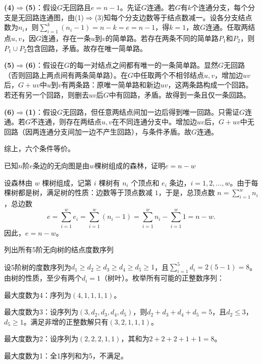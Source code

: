\textbf{(4)$\Rightarrow$(5)}：假设$G$无回路且$e=n-1$。先证$G$连通。若$G$有$k$个连通分支，每个分支是无回路连通图，由(1)$\Rightarrow$(3)知每个分支边数等于结点数减一。设各分支结点数为$n_i$，则$\sum_{i=1}^k (n_i-1)=n-k=e=n-1$，得$k=1$，故$G$连通。任取两结点$u,v$，因$G$连通，存在一条$u$到$v$的简单路。若存在两条不同的简单路$P_1$和$P_2$，则$P_1\cup P_2$包含回路，矛盾。故存在唯一简单路。

\textbf{(5)$\Rightarrow$(6)}：假设在$G$的每一对结点之间都有唯一的一条简单路。显然$G$无回路（否则回路上两点间有两条简单路）。在$G$中任取两个不相邻结点$u,v$，增加边$uv$后，$G+uv$中$u$到$v$有两条路：原唯一简单路和新边$uv$，这两条路构成一个回路。若还有另一个回路，则删去$uv$后$G$中有回路，矛盾。故得到一条且仅一条回路。

\textbf{(6)$\Rightarrow$(1)}：假设$G$无回路，但任意两结点间加一边后得到唯一回路。只需证$G$连通。若$G$不连通，则存在两结点$u,v$在不同连通分支中。增加边$uv$后，$G+uv$中无回路（因两连通分支间加一边不产生回路），与条件矛盾。故$G$连通。

综上，六个条件等价。
\begin{example}{}{}
    已知$n$阶$e$条边的无向图是由$w$棵树组成的森林，证明$e=n-w$
\end{example}
设森林由 $w$ 棵树组成，记第 $i$ 棵树有 $n_i$ 个顶点和 $e_i$ 条边，$i=1,2,\dots,w$。由于每棵树都是树，满足树的性质：边数等于顶点数减 $1$，于是，总顶点数 $n = \sum_{i=1}^w n_i$，总边数
    \[
    e = \sum_{i=1}^w e_i = \sum_{i=1}^w (n_i - 1) = \sum_{i=1}^w n_i - \sum_{i=1}^w 1 = n - w.
    \]
    因此，$e = n - w$。
\begin{example}{}{}
列出所有5阶无向树的结点度数序列
\end{example}
设5阶树的度数序列为$d_1 \ge d_2 \ge d_3 \ge d_4 \ge d_5 \ge 1$，且$\displaystyle\sum_{i=1}^5 d_i = 2(5-1) = 8$。由树的性质，至少有两个$d_i = 1$（树叶）。枚举所有可能的正整数序列：

最大度数为4：序列为$(4,1,1,1,1)$。
 
最大度数为3：设序列为$(3, d_2, d_3, d_4, d_5)$，则$d_2 + d_3 + d_4 + d_5 = 5$，且$d_2 \le 3$，$d_5 \ge 1$。满足非增的正整数解只有$(3,2,1,1,1)$。

最大度数为2：设序列为$(2,2,2,1,1)$，其和为$2+2+2+1+1=8$。

最大度数为1：全1序列和为5，不满足。

